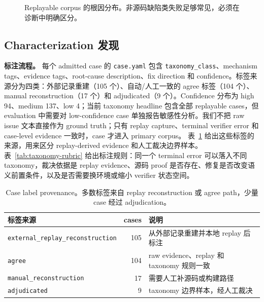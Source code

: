 \documentclass[letterpaper,twocolumn,10pt]{article}
\newcommand{\code}[1]{\texttt{#1}}
\begin{document}
\begin{figure}[t]
\centering
{}
\caption{Replayable corpus 的根因分布。非源码缺陷类失败足够常见，必须在诊断中明确区分。}
\label{fig:taxonomy-bars}
\end{figure}

\subsection{Characterization 发现}

\textbf{标注流程。}
每个 admitted case 的 \code{case.yaml} 包含 \code{taxonomy\_class}、mechanism tags、evidence tags、root-cause description、fix direction 和 confidence。标签来源分为四类：外部记录重建（105 个）、自动/人工一致的 agree 标签（104 个）、manual reconstruction（17 个）和 adjudicated（9 个）。Confidence 分布为 high 94、medium 137、low 4；当前 taxonomy headline 包含全部 replayable cases，但 evaluation 中需要对 low-confidence case 单独报告敏感性分析。我们不把 raw issue 文本直接作为 ground truth；只有 replay capture、terminal verifier error 和 case-level evidence 一致时，case 才进入 primary corpus。
表~\ref{tab:label-provenance} 给出这些标签的来源，用来区分 replay-derived evidence 和人工裁决边界样本。表~\ref{tab:taxonomy-rubric} 给出标注规则：同一个 terminal error 可以落入不同 taxonomy，裁决依据是 replay evidence、源码 proof 是否存在、修复是否改变语义前置条件，以及是否需要换环境或缩小 verifier 状态空间。

\begin{table}[t]
\centering
\small
\caption{Case label provenance。多数标签来自 replay reconstruction 或 agree path，少量 case 经过 adjudication。}
\label{tab:label-provenance}
\begin{tabularx}{\columnwidth}{@{}l r X@{}}
\toprule
标签来源 & cases & 说明 \\
\midrule
\code{external\_replay\_reconstruction} & 105 & 从外部记录重建并本地 replay 后标注 \\
\code{agree} & 104 & raw evidence、replay 和 taxonomy 规则一致 \\
\code{manual\_reconstruction} & 17 & 需要人工补源码或构建路径 \\
\code{adjudicated} & 9 & taxonomy 边界样本，经人工裁决 \\
\bottomrule
\end{tabularx}
\end{table}
\end{document}
